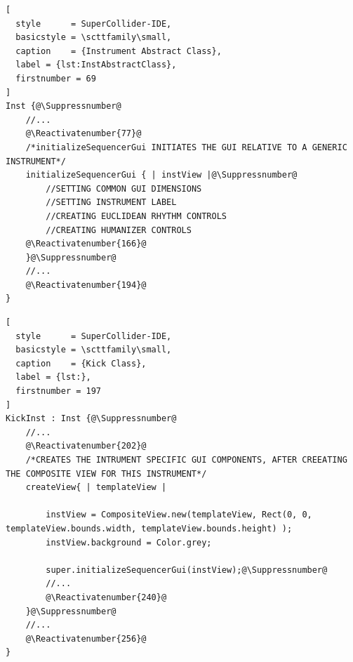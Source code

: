 \documentclass[main.tex]{subfiles}
\begin{document}
\begin{lstlisting}[
  style      = SuperCollider-IDE,
  basicstyle = \scttfamily\small,
  caption    = {Instrument Abstract Class},
  label = {lst:InstAbstractClass},
  firstnumber = 69
]
Inst {@\Suppressnumber@
	//...
	@\Reactivatenumber{77}@
	/*initializeSequencerGui INITIATES THE GUI RELATIVE TO A GENERIC INSTRUMENT*/
	initializeSequencerGui { | instView |@\Suppressnumber@
		//SETTING COMMON GUI DIMENSIONS
		//SETTING INSTRUMENT LABEL
		//CREATING EUCLIDEAN RHYTHM CONTROLS
		//CREATING HUMANIZER CONTROLS
	@\Reactivatenumber{166}@
	}@\Suppressnumber@
	//...
	@\Reactivatenumber{194}@
}
\end{lstlisting}
\begin{lstlisting}[
  style      = SuperCollider-IDE,
  basicstyle = \scttfamily\small,
  caption    = {Kick Class},
  label = {lst:},
  firstnumber = 197
]
KickInst : Inst {@\Suppressnumber@
	//...
	@\Reactivatenumber{202}@
	/*CREATES THE INTRUMENT SPECIFIC GUI COMPONENTS, AFTER CREEATING THE COMPOSITE VIEW FOR THIS INSTRUMENT*/
	createView{ | templateView |

		instView = CompositeView.new(templateView, Rect(0, 0, templateView.bounds.width, templateView.bounds.height) );
		instView.background = Color.grey;

		super.initializeSequencerGui(instView);@\Suppressnumber@
		//...
		@\Reactivatenumber{240}@
	}@\Suppressnumber@
	//...
	@\Reactivatenumber{256}@
}
\end{lstlisting}
\end{document}
